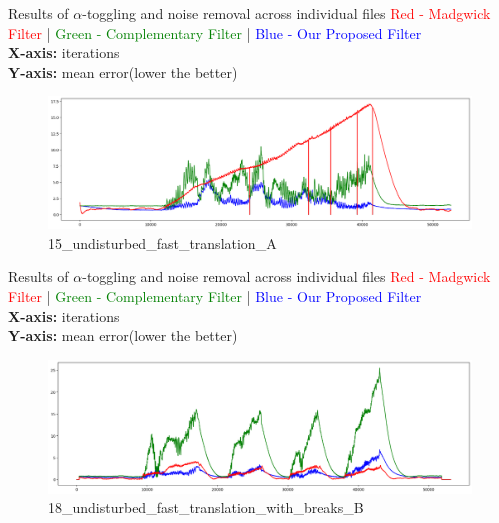 \documentclass[aspectratio=169,xcolor=dvipsnames]{beamer}
\begin{document}
\begin{frame}{Results of $\alpha$-toggling and noise removal across individual files}
\small
\textcolor{red}{Red - Madgwick Filter} | \textcolor{green}{Green - Complementary Filter} | \textcolor{blue}{Blue - Our Proposed Filter} \\ 
\textbf{X-axis:} iterations \\ \textbf{Y-axis:} mean error(lower the better)

\begin{figure}
    \centering
    \includegraphics[width=1\linewidth]{logos/15_undisturbed_fast_translation_A.png}
    \caption{15\_undisturbed\_fast\_translation\_A}
    \label{fig:15_undisturbed_fast_translation}
\end{figure}
\hfill
\end{frame}

\begin{frame}{Results of $\alpha$-toggling and noise removal across individual files}
\small
\textcolor{red}{Red - Madgwick Filter} | \textcolor{green}{Green - Complementary Filter} | \textcolor{blue}{Blue - Our Proposed Filter} \\ 
\textbf{X-axis:} iterations \\ \textbf{Y-axis:} mean error(lower the better)

\begin{figure}
    \centering
    \includegraphics[width=1\linewidth]{logos/18_undisturbed_fast_translation_with_breaks_B.png}
    \caption{18\_undisturbed\_fast\_translation\_with\_breaks\_B}
    \label{fig:18_undisturbed_fast_trans}
\end{figure}
\hfill
\end{frame}
\end{document}
